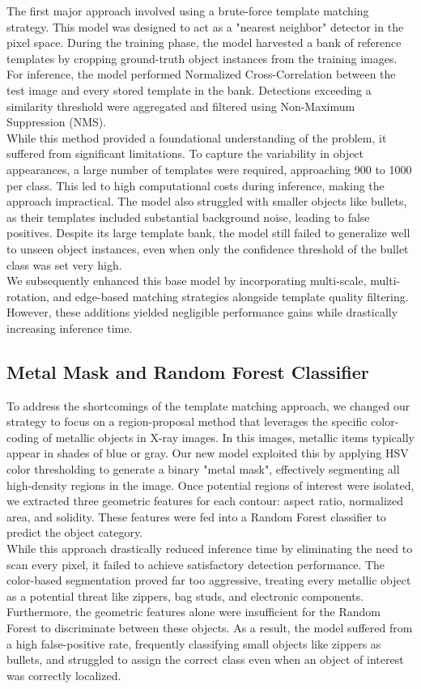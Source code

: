 \documentclass[10pt,a4paper]{article}
\begin{document}
The first major approach involved using a brute-force template matching strategy. This model was designed to act as a "nearest neighbor" detector in the pixel space. During the training phase, the model harvested a bank of reference templates by cropping ground-truth object instances from the training images. For inference, the model performed Normalized Cross-Correlation between the test image and every stored template in the bank. Detections exceeding a similarity threshold were aggregated and filtered using Non-Maximum Suppression (NMS).\\
While this method provided a foundational understanding of the problem, it suffered from significant limitations. To capture the variability in object appearances, a large number of templates were required, approaching 900 to 1000 per class. This led to high computational costs during inference, making the approach impractical. The model also struggled with smaller objects like bullets, as their templates included substantial background noise, leading to false positives. Despite its large template bank, the model still failed to generalize well to unseen object instances, even when only the confidence threshold of the bullet class was set very high. \\
We subsequently enhanced this base model by incorporating multi-scale, multi-rotation, and edge-based matching strategies alongside template quality filtering. However, these additions yielded negligible performance gains while drastically increasing inference time.

\subsection{Metal Mask and Random Forest Classifier}

To address the shortcomings of the template matching approach, we changed our strategy to focus on a region-proposal method that leverages the specific color-coding of metallic objects in X-ray images. In this images, metallic items typically appear in shades of blue or gray. Our new model exploited this by applying HSV color thresholding to generate a binary "metal mask", effectively segmenting all high-density regions in the image. Once potential regions of interest were isolated, we extracted three geometric features for each contour: aspect ratio, normalized area, and solidity. These features were fed into a Random Forest classifier to predict the object category.\\
While this approach drastically reduced inference time by eliminating the need to scan every pixel, it failed to achieve satisfactory detection performance. The color-based segmentation proved far too aggressive, treating every metallic object as a potential threat like zippers, bag studs, and electronic components. Furthermore, the geometric features alone were insufficient for the Random Forest to discriminate between these objects. As a result, the model suffered from a high false-positive rate, frequently classifying small objects like zippers as bullets, and struggled to assign the correct class even when an object of interest was correctly localized.
\end{document}
